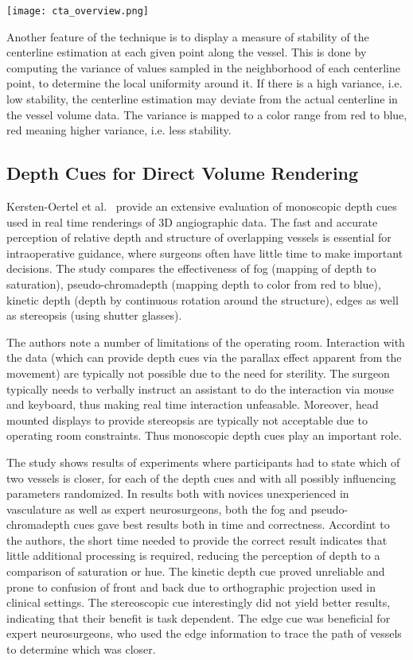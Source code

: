\begin{figure*}[htb]
  \centering
  \texttt{[image: cta\_overview.png]}
  \caption{\label{fig:ctaOverview} }
\end{figure*}
Another feature of the technique is to display a measure of stability of the centerline estimation at each given point along the vessel. This is done by computing the variance of values sampled in the neighborhood of each centerline point, to determine the local uniformity around it. If there is a high variance, i.e. low stability, the centerline estimation may deviate from the actual centerline in the vessel volume data. The variance is mapped to a color range from red to blue, red meaning higher variance, i.e. less stability.


\subsection*{Depth Cues for Direct Volume Rendering}

Kersten-Oertel et al.~\cite{kersten2014evaluation} provide an extensive evaluation of monoscopic depth cues used in real time renderings of 3D angiographic data. The fast and accurate perception of relative depth and structure of overlapping vessels is essential for intraoperative guidance, where surgeons often have little time to make important decisions. The study compares the effectiveness of fog (mapping of depth to saturation), pseudo-chromadepth (mapping depth to color from red to blue), kinetic depth (depth by continuous rotation around the structure), edges as well as stereopsis (using shutter glasses). 

The authors note a number of limitations of the operating room. Interaction with the data (which can provide depth cues via the parallax effect apparent from the movement) are typically not possible due to the need for sterility. The surgeon typically needs to verbally instruct an assistant to do the interaction via mouse and keyboard, thus making real time interaction unfeasable. Moreover, head mounted displays to provide stereopsis are typically not acceptable due to operating room constraints. Thus monoscopic depth cues play an important role.

The study shows results of experiments where participants had to state which of two vessels is closer, for each of the depth cues and with all possibly influencing parameters randomized.
In results both with novices unexperienced in vasculature as well as expert neurosurgeons, both the fog and pseudo-chromadepth cues gave best results both in time and correctness. Accordint to the authors, the short time needed to provide the correct result indicates that little additional processing is required, reducing the perception of depth to a comparison of saturation or hue. The kinetic depth cue proved unreliable and prone to confusion of front and back due to orthographic projection used in clinical settings. The stereoscopic cue interestingly did not yield better results, indicating that their benefit is task dependent. The edge cue was beneficial for expert neurosurgeons, who used the edge information to trace the path of vessels to determine which was closer.
